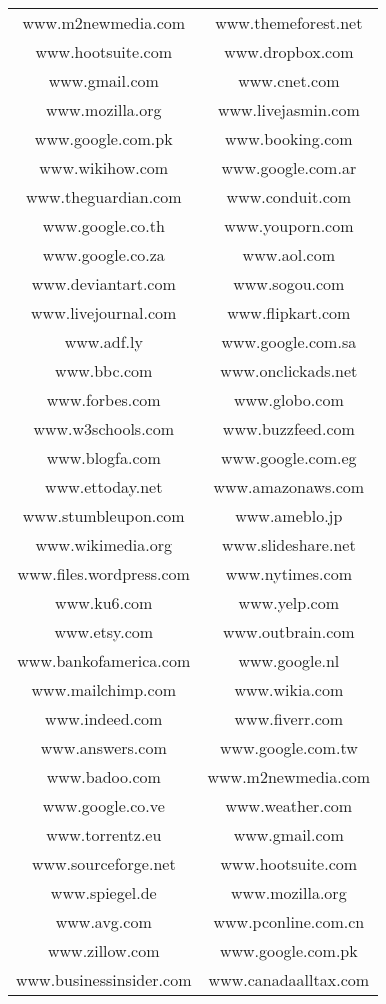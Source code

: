 \begin{longtable}{c c}
www.m2newmedia.com & www.themeforest.net \\
www.hootsuite.com & www.dropbox.com \\
www.gmail.com & www.cnet.com \\
www.mozilla.org & www.livejasmin.com \\
www.google.com.pk & www.booking.com \\
www.wikihow.com & www.google.com.ar \\
www.theguardian.com & www.conduit.com \\
www.google.co.th & www.youporn.com \\
www.google.co.za & www.aol.com \\
www.deviantart.com & www.sogou.com \\
www.livejournal.com & www.flipkart.com \\
www.adf.ly & www.google.com.sa \\
www.bbc.com & www.onclickads.net \\
www.forbes.com & www.globo.com \\
www.w3schools.com & www.buzzfeed.com \\
www.blogfa.com & www.google.com.eg \\
www.ettoday.net & www.amazonaws.com \\
www.stumbleupon.com & www.ameblo.jp \\
www.wikimedia.org & www.slideshare.net \\
www.files.wordpress.com & www.nytimes.com \\
www.ku6.com & www.yelp.com \\
www.etsy.com & www.outbrain.com \\
www.bankofamerica.com & www.google.nl \\
www.mailchimp.com & www.wikia.com \\
www.indeed.com & www.fiverr.com \\
www.answers.com & www.google.com.tw \\
www.badoo.com & www.m2newmedia.com \\
www.google.co.ve & www.weather.com \\
www.torrentz.eu & www.gmail.com \\
www.sourceforge.net & www.hootsuite.com \\
www.spiegel.de & www.mozilla.org \\
www.avg.com & www.pconline.com.cn \\
www.zillow.com & www.google.com.pk \\
www.businessinsider.com & www.canadaalltax.com \\

\end{longtable}
